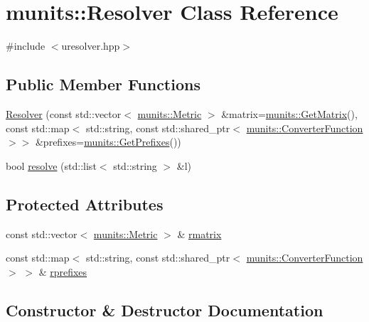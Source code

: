 \hypertarget{classmunits_1_1_resolver}{}\section{munits\+:\+:Resolver Class Reference}
\label{classmunits_1_1_resolver}


{\ttfamily \#include $<$uresolver.\+hpp$>$}

\subsection*{Public Member Functions}
\begin{DoxyCompactItemize}
\item 
\hyperlink{classmunits_1_1_resolver_a7c5d7929af94f1edb1041efc70298ab2}{Resolver} (const std\+::vector$<$ \hyperlink{structmunits_1_1_metric}{munits\+::\+Metric} $>$ \&matrix=\hyperlink{namespacemunits_a8bf80780c6ef4ce5b588d266a2de306e}{munits\+::\+Get\+Matrix}(), const std\+::map$<$ std\+::string, const std\+::shared\+\_\+ptr$<$ \hyperlink{classmunits_1_1_converter_function}{munits\+::\+Converter\+Function} $>$$>$ \&prefixes=\hyperlink{namespacemunits_a43150beff0a68af86df9d5a02e69b334}{munits\+::\+Get\+Prefixes}())
\item 
bool \hyperlink{classmunits_1_1_resolver_a07c4a19ce9774fe126907482e108e811}{resolve} (std\+::list$<$ std\+::string $>$ \&l)
\end{DoxyCompactItemize}
\subsection*{Protected Attributes}
\begin{DoxyCompactItemize}
\item 
const std\+::vector$<$ \hyperlink{structmunits_1_1_metric}{munits\+::\+Metric} $>$ \& \hyperlink{classmunits_1_1_resolver_a08d9cca2538741f5931b108072c60888}{rmatrix}
\item 
const std\+::map$<$ std\+::string, const std\+::shared\+\_\+ptr$<$ \hyperlink{classmunits_1_1_converter_function}{munits\+::\+Converter\+Function} $>$ $>$ \& \hyperlink{classmunits_1_1_resolver_ad7d28db5df350e57ecda95aaae2a2e35}{rprefixes}
\end{DoxyCompactItemize}


\subsection{Constructor \& Destructor Documentation}
\mbox{\label{classmunits_1_1_resolver_a7c5d7929af94f1edb1041efc70298ab2}} 
